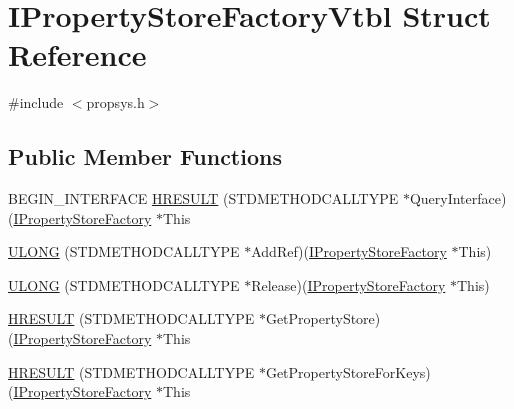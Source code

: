 \hypertarget{struct_i_property_store_factory_vtbl}{}\section{I\+Property\+Store\+Factory\+Vtbl Struct Reference}
\label{struct_i_property_store_factory_vtbl}


{\ttfamily \#include $<$propsys.\+h$>$}

\subsection*{Public Member Functions}
\begin{DoxyCompactItemize}
\item 
B\+E\+G\+I\+N\+\_\+\+I\+N\+T\+E\+R\+F\+A\+CE \hyperlink{struct_i_property_store_factory_vtbl_a7496c54e4511b5fb7423dd2b26974cf8}{H\+R\+E\+S\+U\+LT} (S\+T\+D\+M\+E\+T\+H\+O\+D\+C\+A\+L\+L\+T\+Y\+PE $\ast$Query\+Interface)(\hyperlink{propsys_8h_af937699803bed12461b75f9ee6f8b7b7}{I\+Property\+Store\+Factory} $\ast$This
\item 
\hyperlink{struct_i_property_store_factory_vtbl_abf0525a0ee7cf8f55624cd6895fcf37d}{U\+L\+O\+NG} (S\+T\+D\+M\+E\+T\+H\+O\+D\+C\+A\+L\+L\+T\+Y\+PE $\ast$Add\+Ref)(\hyperlink{propsys_8h_af937699803bed12461b75f9ee6f8b7b7}{I\+Property\+Store\+Factory} $\ast$This)
\item 
\hyperlink{struct_i_property_store_factory_vtbl_a72d2ec350278b4dc4610d539a881ba06}{U\+L\+O\+NG} (S\+T\+D\+M\+E\+T\+H\+O\+D\+C\+A\+L\+L\+T\+Y\+PE $\ast$Release)(\hyperlink{propsys_8h_af937699803bed12461b75f9ee6f8b7b7}{I\+Property\+Store\+Factory} $\ast$This)
\item 
\hyperlink{struct_i_property_store_factory_vtbl_a9b96a6f971e1ee889f80ddd654ec8f96}{H\+R\+E\+S\+U\+LT} (S\+T\+D\+M\+E\+T\+H\+O\+D\+C\+A\+L\+L\+T\+Y\+PE $\ast$Get\+Property\+Store)(\hyperlink{propsys_8h_af937699803bed12461b75f9ee6f8b7b7}{I\+Property\+Store\+Factory} $\ast$This
\item 
\hyperlink{struct_i_property_store_factory_vtbl_a0433db79e29162d6254fdcf4d81fbe8a}{H\+R\+E\+S\+U\+LT} (S\+T\+D\+M\+E\+T\+H\+O\+D\+C\+A\+L\+L\+T\+Y\+PE $\ast$Get\+Property\+Store\+For\+Keys)(\hyperlink{propsys_8h_af937699803bed12461b75f9ee6f8b7b7}{I\+Property\+Store\+Factory} $\ast$This
\end{DoxyCompactItemize}
